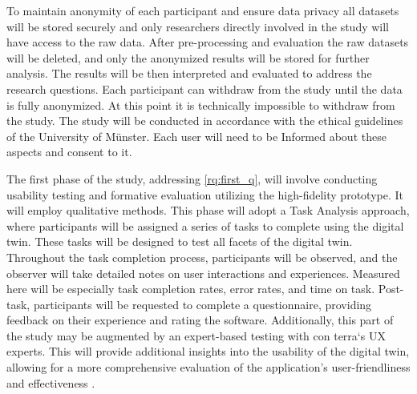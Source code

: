 \documentclass[11pt, titlepage, a4paper]{scrartcl}
\begin{document}
\begin{linenumbers}
    To maintain anonymity of each participant and ensure data privacy all datasets will be stored securely and only researchers directly involved in the study will have access to the raw data. After pre-processing and evaluation the raw datasets will be deleted, and only the anonymized results will be stored for further analysis. The results will be then interpreted and evaluated to address the research questions. Each participant can withdraw from the study until the data is fully anonymized. At this point it is technically impossible to withdraw from the study. The study will be conducted in accordance with the ethical guidelines of the University of Münster. Each user will need to be Informed about these aspects and consent to it. %


    The first phase of the study, addressing \cref{rq:first_q}, will involve conducting usability testing and formative evaluation utilizing the high-fidelity prototype. It will employ qualitative methods. This phase will adopt a Task Analysis approach, where participants will be assigned a series of tasks to complete using the digital twin. These tasks will be designed to test all facets of the digital twin. Throughout the task completion process, participants will be observed, and the observer will take detailed notes on user interactions and experiences. Measured here will be especially task completion rates, error rates, and time on task.
    Post-task, participants will be requested to complete a questionnaire, providing feedback on their experience and rating the software. Additionally, this part of the study may be augmented by an expert-based testing with con terra`s UX experts. This will provide additional insights into the usability of the digital twin, allowing for a more comprehensive evaluation of the application's user-friendliness and effectiveness \cite{lazarResearchMethodsHuman2017}.


\end{linenumbers}
\end{document}
